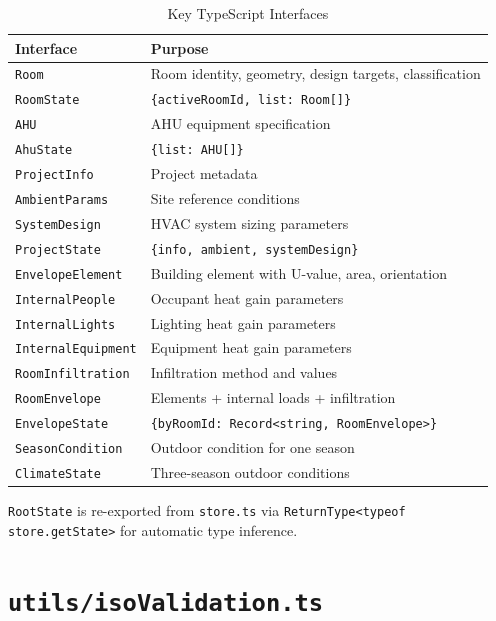 \documentclass[12pt, a4paper, oneside]{report}
\newcommand{\file}[1]{\texttt{\textcolor{codeblue}{#1}}}
\newcommand{\code}[1]{\texttt{\textcolor{codered}{#1}}}
\begin{document}
\begin{table}[H]
\centering
\caption{Key TypeScript Interfaces}
\begin{tabularx}{\textwidth}{lX}
\toprule
\textbf{Interface} & \textbf{Purpose} \\
\midrule
\code{Room}              & Room identity, geometry, design targets, classification \\
\code{RoomState}         & \code{\{activeRoomId, list: Room[]\}} \\
\code{AHU}               & AHU equipment specification \\
\code{AhuState}          & \code{\{list: AHU[]\}} \\
\code{ProjectInfo}       & Project metadata \\
\code{AmbientParams}     & Site reference conditions \\
\code{SystemDesign}      & HVAC system sizing parameters \\
\code{ProjectState}      & \code{\{info, ambient, systemDesign\}} \\
\code{EnvelopeElement}   & Building element with U-value, area, orientation \\
\code{InternalPeople}    & Occupant heat gain parameters \\
\code{InternalLights}    & Lighting heat gain parameters \\
\code{InternalEquipment} & Equipment heat gain parameters \\
\code{RoomInfiltration}  & Infiltration method and values \\
\code{RoomEnvelope}      & Elements + internal loads + infiltration \\
\code{EnvelopeState}     & \code{\{byRoomId: Record<string, RoomEnvelope>\}} \\
\code{SeasonCondition}   & Outdoor condition for one season \\
\code{ClimateState}      & Three-season outdoor conditions \\
\bottomrule
\end{tabularx}
\end{table}

\code{RootState} is re-exported from \code{store.ts} via \code{ReturnType<typeof store.getState>} for automatic type inference.

\section{\file{utils/isoValidation.ts}}
\end{document}
